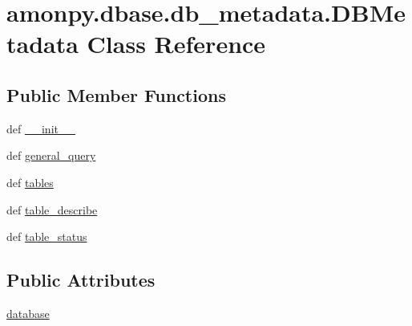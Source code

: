 \hypertarget{classamonpy_1_1dbase_1_1db__metadata_1_1_d_b_metadata}{\section{amonpy.\-dbase.\-db\-\_\-metadata.\-D\-B\-Metadata Class Reference}
\label{classamonpy_1_1dbase_1_1db__metadata_1_1_d_b_metadata}
}
\subsection*{Public Member Functions}
\begin{DoxyCompactItemize}
\item 
def \hyperlink{classamonpy_1_1dbase_1_1db__metadata_1_1_d_b_metadata_ab4efcff7fa63e142f967fc7f1e4a19cb}{\-\_\-\-\_\-init\-\_\-\-\_\-}
\item 
def \hyperlink{classamonpy_1_1dbase_1_1db__metadata_1_1_d_b_metadata_a05958075f50fd3ca587a6100f8577df8}{general\-\_\-query}
\item 
def \hyperlink{classamonpy_1_1dbase_1_1db__metadata_1_1_d_b_metadata_a5ef6b3a8eec1312c4548e333bcca5810}{tables}
\item 
def \hyperlink{classamonpy_1_1dbase_1_1db__metadata_1_1_d_b_metadata_a97b166af235aa1ce243ebc75fa7a3b06}{table\-\_\-describe}
\item 
def \hyperlink{classamonpy_1_1dbase_1_1db__metadata_1_1_d_b_metadata_a32c4cd6bab19d0282cc77ffde68b541a}{table\-\_\-status}
\end{DoxyCompactItemize}
\subsection*{Public Attributes}
\begin{DoxyCompactItemize}
\item 
\hyperlink{classamonpy_1_1dbase_1_1db__metadata_1_1_d_b_metadata_a83f51394bdc748df21c490b8ceef0dea}{database}
\end{DoxyCompactItemize}


